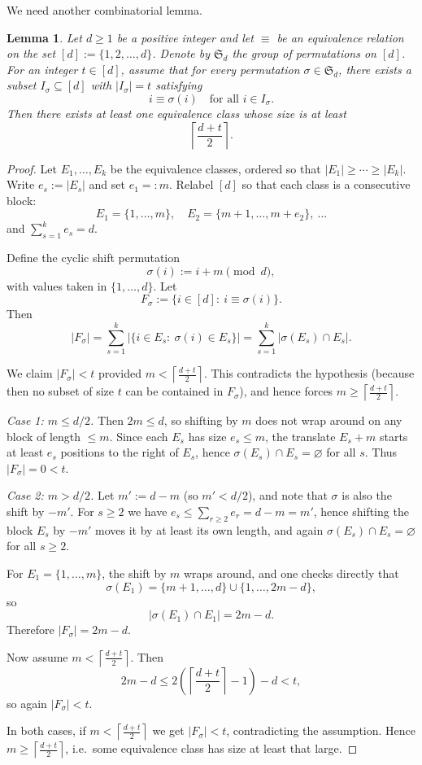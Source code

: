\documentclass[12pt,reqno]{amsart}
\numberwithin{equation}{section}
\newtheorem{lemma}[theorem]{Lemma}
\begin{document}
We need another combinatorial lemma.




\begin{lemma}\label{lem:counting}
Let $d\geq 1$ be a positive integer and let $\equiv$ be an equivalence relation on the set $[d] := \{1,2,\dots,d\}$.
Denote by $\mathfrak{S}_d$ the group of permutations on $[d]$.
For an integer $t\in [d]$, assume that for every permutation $\sigma \in \mathfrak{S}_d$, there exists a subset
$I_{\sigma}\subseteq [d]$ with $|I_{\sigma}|=t$ satisfying
\[
i\equiv \sigma(i) \quad \text{for all } i\in I_{\sigma}.
\]
Then there exists at least one equivalence class whose size is at least
\[
\left\lceil \frac{d+t}{2} \right\rceil.
\]
\end{lemma}

\begin{proof}
Let $E_1,\dots,E_k$ be the equivalence classes, ordered so that $|E_1|\ge \cdots \ge |E_k|$.
Write $e_s:=|E_s|$ and set $e_1=:m$.
Relabel $[d]$ so that each class is a consecutive block:
\[
E_1=\{1,\dots,m\},\quad E_2=\{m+1,\dots,m+e_2\},\ \dots
\]
and $\sum_{s=1}^k e_s=d$.

Define the cyclic shift permutation
\[
\sigma(i):= i+m \pmod d,
\]
with values taken in $\{1,\dots,d\}$.
Let
\[
F_\sigma:=\{i\in[d]:\ i\equiv \sigma(i)\}.
\]
Then
\[
|F_\sigma|
=\sum_{s=1}^k |\{i\in E_s:\ \sigma(i)\in E_s\}|
=\sum_{s=1}^k |\sigma(E_s)\cap E_s|.
\]

We claim $|F_\sigma|<t$ provided $m<\left\lceil\frac{d+t}{2}\right\rceil$.
This contradicts the hypothesis (because then no subset of size $t$ can be contained in $F_\sigma$), and hence forces
$m\ge\left\lceil\frac{d+t}{2}\right\rceil$.

\smallskip\noindent
\emph{Case 1: $m\le d/2$.}
Then $2m\le d$, so shifting by $m$ does not wrap around on any block of length $\le m$.
Since each $E_s$ has size $e_s\le m$, the translate $E_s+m$ starts at least $e_s$ positions to the right of $E_s$,
hence $\sigma(E_s)\cap E_s=\varnothing$ for all $s$.
Thus $|F_\sigma|=0<t$.

\smallskip\noindent
\emph{Case 2: $m>d/2$.}
Let $m':=d-m$ (so $m'<d/2$), and note that $\sigma$ is also the shift by $-m'$.
For $s\ge 2$ we have $e_s\le \sum_{r\ge 2} e_r = d-m = m'$, hence shifting the block $E_s$ by $-m'$ moves it by at least its own length,
and again $\sigma(E_s)\cap E_s=\varnothing$ for all $s\ge 2$.

For $E_1=\{1,\dots,m\}$, the shift by $m$ wraps around, and one checks directly that
\[
\sigma(E_1)=\{m+1,\dots,d\}\cup\{1,\dots,2m-d\},
\]
so
\[
|\sigma(E_1)\cap E_1|=2m-d.
\]
Therefore $|F_\sigma|=2m-d$.

Now assume $m<\left\lceil\frac{d+t}{2}\right\rceil$. Then
\[
2m-d \le 2\left(\left\lceil\frac{d+t}{2}\right\rceil-1\right)-d < t,
\]
so again $|F_\sigma|<t$.

\smallskip
In both cases, if $m<\left\lceil\frac{d+t}{2}\right\rceil$ we get $|F_\sigma|<t$, contradicting the assumption.
Hence $m\ge \left\lceil\frac{d+t}{2}\right\rceil$, i.e.\ some equivalence class has size at least that large.
\end{proof}
\end{document}
